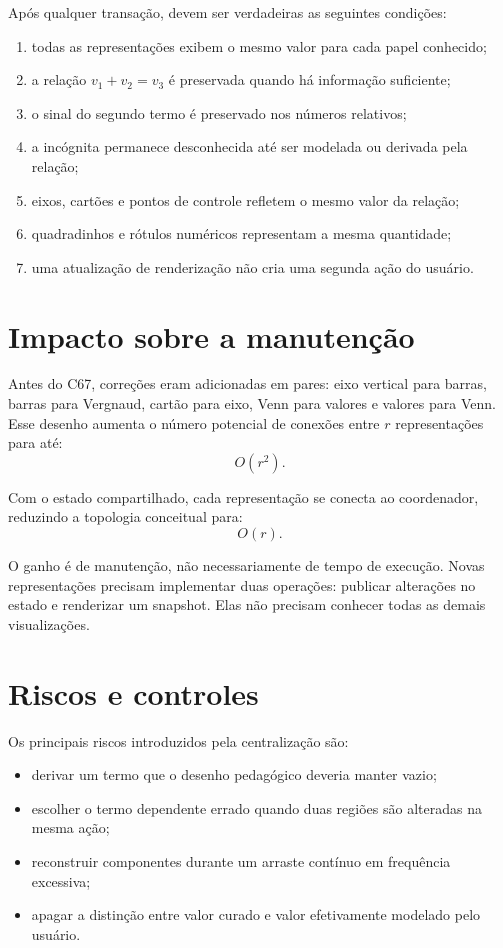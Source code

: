 \documentclass[12pt,a4paper]{article}
\begin{document}
Após qualquer transação, devem ser verdadeiras as seguintes condições:
\begin{enumerate}[noitemsep]
  \item todas as representações exibem o mesmo valor para cada papel conhecido;
  \item a relação $v_1+v_2=v_3$ é preservada quando há informação suficiente;
  \item o sinal do segundo termo é preservado nos números relativos;
  \item a incógnita permanece desconhecida até ser modelada ou derivada pela relação;
  \item eixos, cartões e pontos de controle refletem o mesmo valor da relação;
  \item quadradinhos e rótulos numéricos representam a mesma quantidade;
  \item uma atualização de renderização não cria uma segunda ação do usuário.
\end{enumerate}

\section{Impacto sobre a manutenção}

Antes do C67, correções eram adicionadas em pares: eixo vertical para barras, barras para Vergnaud, cartão para eixo, Venn para valores e valores para Venn. Esse desenho aumenta o número potencial de conexões entre $r$ representações para até:
\[
O(r^2).
\]

Com o estado compartilhado, cada representação se conecta ao coordenador, reduzindo a topologia conceitual para:
\[
O(r).
\]

O ganho é de manutenção, não necessariamente de tempo de execução. Novas representações precisam implementar duas operações: publicar alterações no estado e renderizar um snapshot. Elas não precisam conhecer todas as demais visualizações.

\section{Riscos e controles}

Os principais riscos introduzidos pela centralização são:
\begin{itemize}[noitemsep]
  \item derivar um termo que o desenho pedagógico deveria manter vazio;
  \item escolher o termo dependente errado quando duas regiões são alteradas na mesma ação;
  \item reconstruir componentes durante um arraste contínuo em frequência excessiva;
  \item apagar a distinção entre valor curado e valor efetivamente modelado pelo usuário.
\end{itemize}
\end{document}
